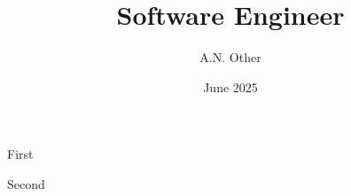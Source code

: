 \documentclass{smart-cv}
\author{A.N. Other}
\title{Software Engineer}
\date{June 2025}
\begin{document}
  \begin{two-col}
    {
      First
    }

    Second
  \end{two-col}
\end{document}
